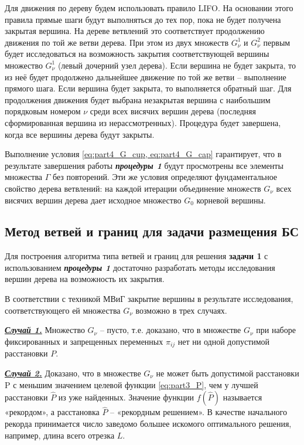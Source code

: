 Для движения по дереву будем использовать правило LIFO. На основании этого правила прямые шаги будут выполняться до тех пор, пока не будет получена закрытая вершина. На дереве ветвлений это соответствует продолжению движения по той же ветви дерева. При этом из двух множеств $G^1_\nu$  и $G^2_\nu$ первым будет исследоваться на возможность закрытия соответствующей вершины множество $G^1_\nu$ (левый дочерний узел дерева). Если вершина не будет закрыта, то из неё будет продолжено дальнейшее движение по той же ветви -- выполнение прямого шага. Если вершина будет закрыта, то выполняется обратный шаг. Для продолжения движения будет выбрана незакрытая вершина с наибольшим порядковым номером $\nu$ среди всех висячих вершин дерева (последняя сформированная вершина из нерассмотренных). Процедура будет завершена, когда все вершины дерева будут закрыты.

Выполнение условия \cref{eq:part4_G_cup, eq:part4_G_cap} гарантирует, что в результате завершения работы \textit{\textbf{процедуры 1}} будут просмотрены все элементы множества $\Gamma$ без повторений. Эти же условия определяют фундаментальное свойство дерева ветвлений: на каждой итерации объединение множеств $G_\nu$ всех висячих вершин дерева дает исходное множество $G_0$ корневой вершины.

\subsection{Метод ветвей и границ для задачи размещения БС} \label{BnB}
Для построения алгоритма типа ветвей и границ для решения \textbf{задачи 1} с использованием \textit{\textbf{процедуры 1}} достаточно разработать методы исследования вершин дерева на возможность их закрытия.

В соответствии с техникой МВиГ закрытие вершины в результате исследования, соответствующего ей множества $G_\nu$ возможно в трех случаях.

\underline{\textit{\textbf{Случай 1.}}} Множество $G_\nu$ -- пусто, т.е. доказано, что в множестве $G_\nu$ при наборе фиксированных и запрещенных переменных $\pi_{ij}$ нет ни одной допустимой расстановки $P$.

\underline{\textit{\textbf{Случай 2.}}} Доказано, что в множестве $G_\nu$ не может быть допустимой расстановки P с меньшим значением целевой функции \cref{eq:part3_P}, чем у лучшей расстановки $\widehat{P}$ из уже найденных. Значение функции $f(\widehat{P})$ называется «рекордом», а расстановка $\widehat{P}$ -- «рекордным решением». В качестве начального рекорда принимается число заведомо большее искомого оптимального решения, например,  длина всего отрезка $L$.

